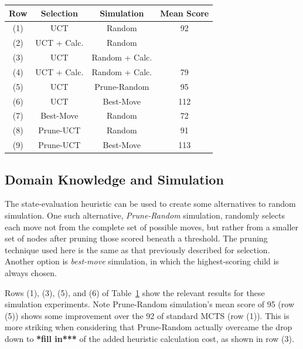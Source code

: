 \documentclass[letterpaper]{article}
\begin{document}
\begin{table}
\label{tbl:SelSim}
\centering
\begin{tabular}{c c c c}
\hline
{\bf Row} & {\bf Selection} & {\bf Simulation} & {\bf Mean Score} \\
\hline
\hline
(1) & UCT & Random & 92 \\
(2) & UCT + Calc. & Random & \\
(3) & UCT & Random + Calc. & \\
(4) & UCT + Calc. & Random + Calc. & 79 \\
\hline
(5) & UCT & Prune-Random & 95 \\
(6) & UCT & Best-Move & 112 \\
\hline
(7) & Best-Move & Random & 72 \\
(8) & Prune-UCT & Random & 91 \\
\hline
(9) & Prune-UCT & Best-Move & 113 \\
\hline
\end{tabular}
\end{table}

\subsection{Domain Knowledge and Simulation}


The state-evaluation heuristic can be used to create some alternatives to random simulation. One such alternative, {\it Prune-Random} simulation, randomly selects each move not from the complete set of possible moves, but rather from a smaller set of nodes after pruning those scored beneath a threshold. The pruning technique used here is the same as that previously described for selection. Another option is {\it best-move} simulation, in which the highest-scoring child is always chosen.

Rows (1), (3), (5), and (6) of Table~\ref{tbl:SelSim} show the relevant results for these simulation experiments. Note Prune-Random simulation's mean score of 95 (row (5)) shows some improvement over the 92 of standard MCTS (row (1)). This is more striking when considering that Prune-Random actually overcame the drop down to {\bf **fill in***} of the added heuristic calculation cost, as shown in row (3).
\end{document}

